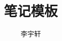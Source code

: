 \documentclass{notebook-neon}
\title{笔记模板}
\author{李宇轩}
\begin{document}
\maketitle

\frontmatter

\makesymb

\tableofcontents
\listoffigures
\listoftables
\lstlistoflistings

\mainmatter

\nocite{*}



\appendix

\backmatter


\end{document}
